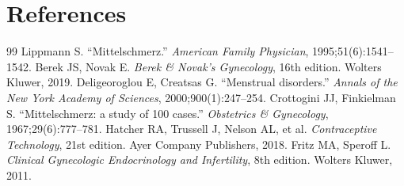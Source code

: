 \section*{References}
\begin{thebibliography}{99}
 Lippmann S. ``Mittelschmerz.'' \textit{American Family Physician}, 1995;51(6):1541--1542.
 Berek JS, Novak E. \textit{Berek \& Novak's Gynecology}, 16th edition. Wolters Kluwer, 2019.
 Deligeoroglou E, Creatsas G. ``Menstrual disorders.'' \textit{Annals of the New York Academy of Sciences}, 2000;900(1):247--254.
 Crottogini JJ, Finkielman S. ``Mittelschmerz: a study of 100 cases.'' \textit{Obstetrics \& Gynecology}, 1967;29(6):777--781.
 Hatcher RA, Trussell J, Nelson AL, et al. \textit{Contraceptive Technology}, 21st edition. Ayer Company Publishers, 2018.
 Fritz MA, Speroff L. \textit{Clinical Gynecologic Endocrinology and Infertility}, 8th edition. Wolters Kluwer, 2011.

\end{thebibliography}
